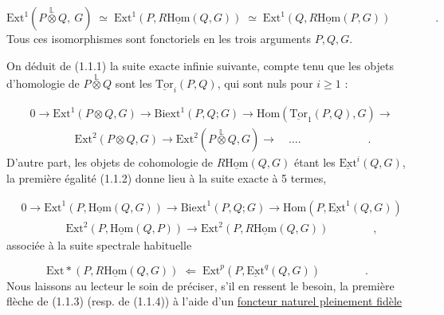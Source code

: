 \begin{equation}\tag{1.1.2}
\mathrm{Ext}^1(P\overset{\mathbb{L}}{\otimes}Q,\ G) \;\simeq\; \mathrm{Ext}^1(P,R\underline{\mathrm{Hom}}(Q,G)) \;\simeq\; \mathrm{Ext}^1(Q,R\underline{\mathrm{Hom}}(P,G)) \qquad\qquad .
\end{equation}
Tous ces isomorphismes sont fonctoriels en les trois arguments $P,Q,G$.

On déduit de (1.1.1) la suite exacte infinie suivante, compte tenu que les objets d'homologie de $P\overset{\mathbb{L}}{\otimes}Q$ sont les $\underline{\mathrm{Tor}}_i(P,Q)$, qui sont nuls pour $i \geqslant 1$ :

\begin{equation}\tag{1.1.3}
\begin{aligned}
&0 \longrightarrow \mathrm{Ext}^1(P\otimes Q,G) \longrightarrow \mathrm{Biext}^1(P,Q;G) \longrightarrow \mathrm{Hom}(\underline{\mathrm{Tor}}_1(P,Q),G) \longrightarrow \\
&\qquad\qquad \mathrm{Ext}^2(P\otimes Q,G) \longrightarrow \mathrm{Ext}^2(P\overset{\mathbb{L}}{\otimes} Q,G) \longrightarrow \quad \ldots. \qquad\qquad\qquad .
\end{aligned}
\end{equation}
D'autre part, les objets de cohomologie de $R\underline{\mathrm{Hom}}(Q,G)$ étant les $\underline{\mathrm{Ext}}^i(Q,G)$, la première égalité (1.1.2) donne lieu à la suite exacte à 5 termes,

\begin{equation}\tag{1.1.4}
\begin{aligned}
&0 \longrightarrow \mathrm{Ext}^1(P,\underline{\mathrm{Hom}}(Q,G)) \longrightarrow \mathrm{Biext}^1(P,Q;G) \longrightarrow \mathrm{Hom}(P,\underline{\mathrm{Ext}}^1(Q,G)) \\
&\qquad\qquad \mathrm{Ext}^2(P,\underline{\mathrm{Hom}}(Q,P)) \longrightarrow \mathrm{Ext}^2(P,R\underline{\mathrm{Hom}}(Q,G)) \qquad\qquad ,
\end{aligned}
\end{equation}
associée à la suite spectrale habituelle

\begin{equation*}
\mathrm{Ext}*(P,R\underline{\mathrm{Hom}}(Q,G)) \;\Longleftarrow\; \mathrm{Ext}^p(P,\underline{\mathrm{Ext}}^q(Q,G)) \qquad\qquad .
\end{equation*}
Nous laissons au lecteur le soin de préciser, s'il en ressent le besoin, la première flèche de (1.1.3) (resp. de (1.1.4)) à l'aide d'un \underline{foncteur naturel pleinement fidèle}

